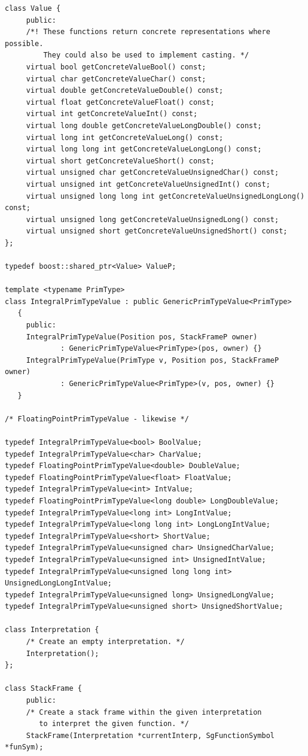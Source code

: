 \begin{enumerate}
\begin{enumerate}
\begin{lstlisting}
class Value {
     public:
     /*! These functions return concrete representations where possible.
         They could also be used to implement casting. */
     virtual bool getConcreteValueBool() const;
     virtual char getConcreteValueChar() const;
     virtual double getConcreteValueDouble() const;
     virtual float getConcreteValueFloat() const;
     virtual int getConcreteValueInt() const;
     virtual long double getConcreteValueLongDouble() const;
     virtual long int getConcreteValueLong() const;
     virtual long long int getConcreteValueLongLong() const;
     virtual short getConcreteValueShort() const;
     virtual unsigned char getConcreteValueUnsignedChar() const;
     virtual unsigned int getConcreteValueUnsignedInt() const;
     virtual unsigned long long int getConcreteValueUnsignedLongLong() const;
     virtual unsigned long getConcreteValueUnsignedLong() const;
     virtual unsigned short getConcreteValueUnsignedShort() const;
};

typedef boost::shared_ptr<Value> ValueP;

template <typename PrimType>
class IntegralPrimTypeValue : public GenericPrimTypeValue<PrimType>
   {
     public:
     IntegralPrimTypeValue(Position pos, StackFrameP owner)
             : GenericPrimTypeValue<PrimType>(pos, owner) {}
     IntegralPrimTypeValue(PrimType v, Position pos, StackFrameP owner)
             : GenericPrimTypeValue<PrimType>(v, pos, owner) {}
   }

/* FloatingPointPrimTypeValue - likewise */

typedef IntegralPrimTypeValue<bool> BoolValue;
typedef IntegralPrimTypeValue<char> CharValue;
typedef FloatingPointPrimTypeValue<double> DoubleValue;
typedef FloatingPointPrimTypeValue<float> FloatValue;
typedef IntegralPrimTypeValue<int> IntValue;
typedef FloatingPointPrimTypeValue<long double> LongDoubleValue;
typedef IntegralPrimTypeValue<long int> LongIntValue;
typedef IntegralPrimTypeValue<long long int> LongLongIntValue;
typedef IntegralPrimTypeValue<short> ShortValue;
typedef IntegralPrimTypeValue<unsigned char> UnsignedCharValue;
typedef IntegralPrimTypeValue<unsigned int> UnsignedIntValue;
typedef IntegralPrimTypeValue<unsigned long long int> UnsignedLongLongIntValue;
typedef IntegralPrimTypeValue<unsigned long> UnsignedLongValue;
typedef IntegralPrimTypeValue<unsigned short> UnsignedShortValue;

class Interpretation {
     /* Create an empty interpretation. */
     Interpretation();
};

class StackFrame {
     public:
     /* Create a stack frame within the given interpretation
        to interpret the given function. */
     StackFrame(Interpretation *currentInterp, SgFunctionSymbol *funSym);


\end{lstlisting}
\end{enumerate}
\end{enumerate}
